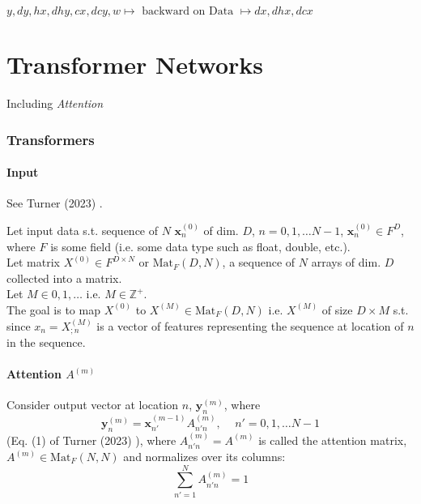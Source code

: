 \documentclass[10pt]{amsart}
\begin{document}
\begin{multicols*}{2}
$y,dy, hx, dhy, cx, dcy, w \mapsto \text{ backward on Data } \mapsto dx, dhx, dcx$


\part{Transformer Networks}

Including \emph{Attention}

\section{Transformers}

\subsection{Input}

See Turner (2023) \cite{Turn2023}.

Let input data s.t. sequence of $N$ $\mathbf{x}^{(0)}_n$ of dim. $D$, $n = 0,1, \dots N-1$, $\mathbf{x}_n^{(0)} \in F^D$, where $F$ is some field (i.e. some data type such as float, double, etc.). \\

Let matrix $X^{(0)} \in F^{D\times N}$ or $\text{Mat}_F(D, N)$, a sequence of $N$ arrays of dim. $D$ collected into a matrix. \\

Let $M \in 0,1,\dots $ i.e. $M \in \mathbb{Z}^+$. \\

The goal is to map $X^{(0)}$ to $X^{(M)} \in \text{Mat}_F(D,N)$ i.e. $X^{(M)}$ of size $D\times M$ s.t. since $x_n = X_{;n}^{(M)}$ is a vector of features representing the sequence at location of $n$ in the sequence.

\subsection{Attention $A^{(m)}$ }

Consider output vector at location $n$, $\mathbf{y}_n^{(m)}$, where 
\begin{equation}
\mathbf{y}_n^{(m)} = \mathbf{x}^{(m -1)}_{n'} A^{(m)}_{n' n}, \quad \, n' = 0,1, \dots N-1
\end{equation} 
(Eq. (1) of Turner (2023) \cite{Turn2023}), where $A^{(m)}_{n' n} = A^{(m)}$ is called the attention matrix, $A^{(m)} \in \text{Mat}_F(N, N)$ and normalizes over its columns:
\begin{equation}
\sum_{n' = 1}^N A^{(m)}_{n' n}  =1
\end{equation}


\end{multicols*}
\end{document}
